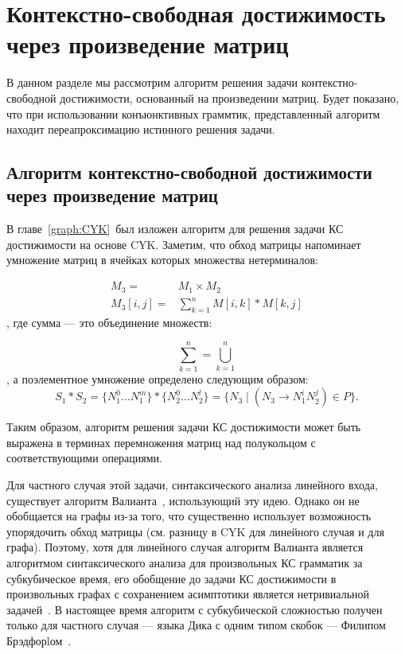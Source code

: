 \chapter[Контекстно-свободная достижимость через произведение матриц]{Контекстно-свободная достижимость через произведение матриц}\label{chpt:MatrixBasedAlgos}

В данном разделе мы рассмотрим алгоритм решения задачи контекстно-свободной достижимости, основанный на произведении матриц. Будет показано, что при использовании конъюнктивных граммтик, представленный алгоритм находит переапроксимацию истинного решения задачи.

\section[Алгоритм контекстно-свободной достижимости через произведение матриц]{Алгоритм контекстно-свободной достижимости через произведение матриц}
\label{Matrix-CFPQ}

В главе~\ref{graph:CYK}~был изложен алгоритм для решения задачи КС достижимости на основе CYK. Заметим, что обход матрицы напоминает умножение матриц в ячейках которых множества нетерминалов:

\begin{align*}
M_3 = &M_1 \times M_2 \\
M_3[i,j] = &\sum_{k=1}^{n} M[i,k] * M[k,j]
\end{align*}
, где сумма --- это объединение множеств:

$$
\sum_{k=1}^{n} = \bigcup_{k=1}^{n}
$$
, а поэлементное умножение определено следующим образом:
$$
S_1 * S_2 = \{N_1^0 ... N_1^m\} * \{N_2^0 ... N_2^l\} = \{N_3 \mid (N_3 \rightarrow N_1^i N_2^j) \in P\}.
$$

Таким образом, алгоритм решения задачи КС достижимости может быть выражена в терминах перемножения матриц над полукольцом с соответствующими операциями.

Для частного случая этой задачи, синтаксического анализа линейного входа, существует алгоритм Валианта~\cite{Valiant:1975:GCR:1739932.1740048}, использующий эту идею.
Однако он не обобщается на графы из-за того, что существенно использует возможность упорядочить обход матрицы (см. разницу в CYK для линейного случая и для графа).
Поэтому, хотя для линейного случая алгоритм Валианта является алгоритмом синтаксического анализа для произвольных КС грамматик за субкубическое время, его обобщение до задачи КС достижимости в произвольных графах с сохранением асимптотики является нетривиальной задачей~\cite{Yannakakis}.
В настоящее время алгоритм с субкубической сложностью получен только для частного случая --- языка Дика с одним типом скобок --- Филипом Брэдфорlом~\cite{8249039}.

